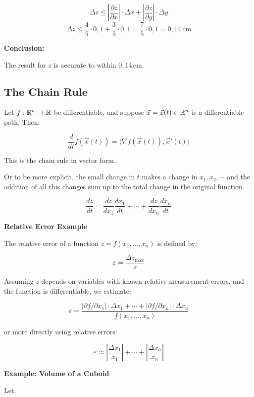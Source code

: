 \[
    \Delta z \leq \left| \frac{\partial z}{\partial x} \right| \cdot \Delta x + \left| \frac{\partial z}
    {\partial y} \right| \cdot \Delta y
\]
\[
    \Delta z \leq \frac{4}{5} \cdot 0{,}1 + \frac{3}{5} \cdot 0{,}1 = \frac{7}{5} \cdot 0{,}1 = 0{,}14 \, 
    \text{cm}
\]

\textbf{Conclusion:}  

The result for \( z \) is accurate to within \( \boxed{0{,}14 \, \text{cm}} \).


\subsection{The Chain Rule}

Let \( f : \mathbb{R}^n \to \mathbb{R} \) be differentiable, and suppose \( \vec{x} = \vec{x}(t) \in \mathbb{R}^n \) 
is a differentiable path. Then:

\[
    \frac{d}{dt} f(\vec{x}(t)) = \langle \nabla f(\vec{x}(t)), \vec{x}'(t) \rangle
\]

This is the chain rule in vector form.

Or to be more explicit, the small change in \(t\) makes a change in \(x_1, x_2, \cdots\) and the addition 
of all this changes sum up to the total change in the original function.

\[
    \frac{dz}{dt} = \frac{dz}{dx_1}\frac{dx_1}{dt} + \cdots + \frac{dz}{dx_n}\frac{dx_n}{dt}
\]

\textbf{Relative Error Example}
\vspace{\baselineskip}

The relative error of a function \( z = f(x_1, \dots, x_n) \) is defined by:

\[
    \varepsilon = \frac{\Delta z_{\max}}{z}
\]

Assuming \( z \) depends on variables with known relative measurement errors, and the function is 
differentiable, we estimate:

\[
    \varepsilon = \frac{|\partial f / \partial x_1| \cdot \Delta x_1 + \cdots + |\partial f / 
    \partial x_n| \cdot \Delta x_n}{f(x_1, \dots, x_n)}
\]

or more directly using relative errors:

\[
    \varepsilon \approx \left| \frac{\Delta x_1}{x_1} \right| + \cdots + \left| \frac{\Delta x_n}{x_n} 
    \right|
\]

\textbf{Example: Volume of a Cuboid}
\vspace{\baselineskip}

Let:

